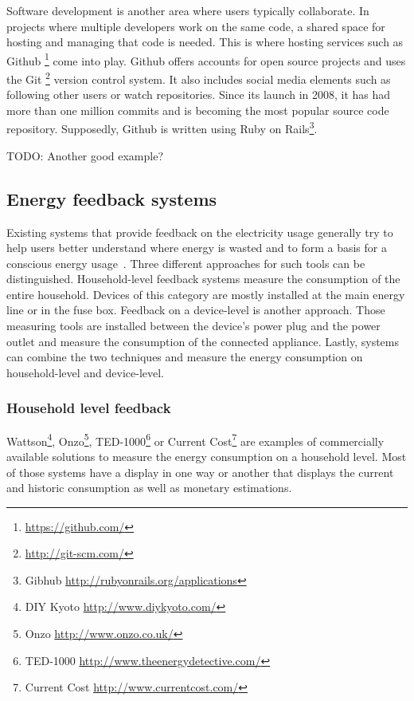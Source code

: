 Software development is another area where users typically collaborate. In projects where multiple developers work on the same code, a shared space for hosting and managing that code is needed. This is where hosting services such as Github \footnote{\url{https://github.com/}} come into play. Github offers accounts for open source projects and uses the Git \footnote{\url{http://git-scm.com/}} version control system. It also includes social media elements such as following other users or watch repositories. Since its launch in 2008, it has had more than one million commits and is becoming the most popular source code repository\cite{inquirer_github}.
Supposedly, Github is written using Ruby on Rails\footnote{Gibhub \url{http://rubyonrails.org/applications}}.

TODO: Another good example?

\subsection{Energy feedback systems}
Existing systems that provide feedback on the electricity usage generally try to help users better understand where energy is wasted and to form a basis for a conscious energy usage~\cite{mattern:inproc:2010}. Three different approaches for such tools can be distinguished. Household-level feedback systems  measure the consumption of the entire household. Devices of this category are mostly installed at the main energy line or in the fuse box. Feedback on a device-level is another approach. Those measuring tools are installed between the device's power plug and the power outlet and measure the consumption of the connected appliance. Lastly, systems can combine the two techniques and measure the energy consumption on household-level and device-level.

\subsubsection{Household level feedback}
Wattson\footnote{DIY Kyoto \url{http://www.diykyoto.com/}}, Onzo\footnote{Onzo \url{http://www.onzo.co.uk/}}, TED-1000\footnote{
TED-1000 \url{http://www.theenergydetective.com/}} or Current Cost\footnote{Current Cost \url{http://www.currentcost.com/}} are examples of commercially available solutions to measure the energy consumption on a household level.  Most of those systems have a display in one way or another that displays the current and historic consumption as well as monetary estimations.  

